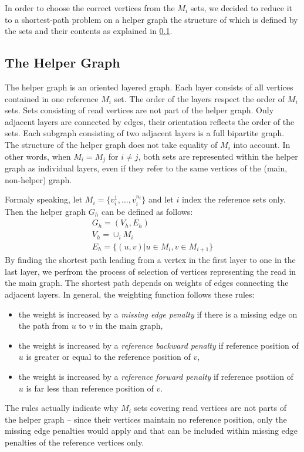 In order to choose the correct vertices from the $M_i$ sets, we decided to reduce it to a shortest-path problem on a helper graph the structure of which is defined by the sets and their contents as explained in \ref{subsec:helper-graph}.

\subsection{The Helper Graph}
\label{subsec:helper-graph}

The helper graph is an oriented layered graph. Each layer consists of all vertices contained in one reference $M_i$ set. The order of the layers respect the order of $M_i$ sets. Sets consisting of read vertices are not part of the helper graph. Only adjacent layers are connected by edges, their orientation reflects the order of the sets. Each subgraph consisting of two adjacent layers is a full bipartite graph. The structure of the helper graph does not take equality of $M_i$ into account. In other words, when $M_i = M_j$ for $i \ne j$, both sets are represented within the helper graph as individual layers, even if they refer to the same vertices of the (main, non-helper) graph.

Formaly speaking, let $M_i = \{v_{i}^{1}, ..., v_{i}^{n_i}\}$ and let $i$ index the reference sets only. Then the helper graph $G_h$ can be defined as follows:
\begin{align}
G_h = (V_h, E_h) \\
V_h = \cup_i M_i \\
E_h = \{(u, v) | u \in M_i, v \in M_{i + 1}\}
\end{align}
By finding the shortest path leading from a vertex in the first layer to one in the last layer, we perfrom the process of selection of vertices representing the read in the main graph. The shortest path depends on weights of edges connecting the adjacent layers. In general, the weighting function follows these rules:
\begin{itemize}
\item the weight is increased by a \textit{missing edge penalty} if there is a missing edge on the path from $u$ to $v$ in the main graph,
\item the weight is increased by a \textit{reference backward penalty} if reference position of $u$ is greater or equal to the reference position of $v$,
\item the weight is increased by a \textit{reference forward penalty} if reference psotiion of $u$ is far less than reference position of $v$.
\end{itemize}
The rules actually indicate why $M_i$ sets covering read vertices are not parts of the helper graph – since their vertices maintain no reference position, only the missing edge penalties would apply and that can be included within missing edge penalties of the reference vertices only.

